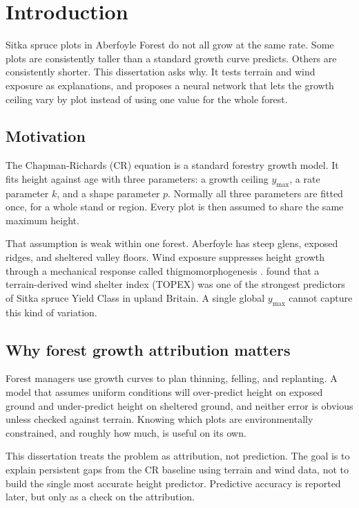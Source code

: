 \chapter{Introduction}
\label{ch:introduction}

Sitka spruce plots in Aberfoyle Forest do not all grow at the same rate. Some plots are consistently taller than a standard growth curve predicts. Others are consistently shorter. This dissertation asks why. It tests terrain and wind exposure as explanations, and proposes a neural network that lets the growth ceiling vary by plot instead of using one value for the whole forest.

\section{Motivation}

The Chapman-Richards (CR) equation \citep{pienaar1973ChapmanRichardsGeneralization} is a standard forestry growth model. It fits height against age with three parameters: a growth ceiling $y_{\max}$, a rate parameter $k$, and a shape parameter $p$. Normally all three parameters are fitted once, for a whole stand or region. Every plot is then assumed to share the same maximum height.

That assumption is weak within one forest. Aberfoyle has steep glens, exposed ridges, and sheltered valley floors. Wind exposure suppresses height growth through a mechanical response called thigmomorphogenesis \citep{telewski2006UnifiedHypothesisMechanoperception}. \citet{worrell1987PredictingProductivitySitka} found that a terrain-derived wind shelter index (TOPEX) was one of the strongest predictors of Sitka spruce Yield Class in upland Britain. A single global $y_{\max}$ cannot capture this kind of variation.

\section{Why forest growth attribution matters}

Forest managers use growth curves to plan thinning, felling, and replanting. A model that assumes uniform conditions will over-predict height on exposed ground and under-predict height on sheltered ground, and neither error is obvious unless checked against terrain. Knowing which plots are environmentally constrained, and roughly how much, is useful on its own.

This dissertation treats the problem as attribution, not prediction. The goal is to explain persistent gaps from the CR baseline using terrain and wind data, not to build the single most accurate height predictor. Predictive accuracy is reported later, but only as a check on the attribution.

